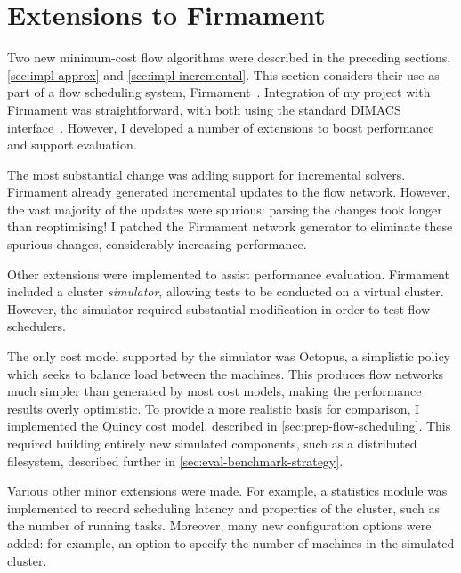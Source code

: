 \section{Extensions to Firmament} \label{sec:impl-firmament}


Two new minimum-cost flow algorithms were described in the preceding sections, \cref{sec:impl-approx} and \cref{sec:impl-incremental}. This section considers their use as part of a flow scheduling system, Firmament~\cite[ch.~5]{Schwarzkopf:2015}. Integration of my project with Firmament was straightforward, with both using the standard DIMACS interface~\cite{DIMACSStandard}. However, I developed a number of extensions to boost performance and support evaluation.

The most substantial change was adding support for incremental solvers. Firmament already generated incremental updates to the flow network. However, the vast majority of the updates were spurious: parsing the changes took longer than reoptimising! I patched the Firmament network generator to eliminate these spurious changes, considerably increasing performance.

Other extensions were implemented to assist performance evaluation. Firmament included a cluster \emph{simulator}, allowing tests to be conducted on a virtual cluster. However, the simulator required substantial modification in order to test flow schedulers.

The only cost model supported by the simulator was Octopus, a simplistic policy which seeks to balance load between the machines. This produces flow networks much simpler than generated by most cost models, making the performance results overly optimistic. To provide a more realistic basis for comparison, I implemented the Quincy cost model, described in \cref{sec:prep-flow-scheduling}. This required building entirely new simulated components, such as a distributed filesystem, described further in \cref{sec:eval-benchmark-strategy}.

Various other minor extensions were made. For example, a statistics module was implemented to record scheduling latency and properties of the cluster, such as the number of running tasks. Moreover, many new configuration options were added: for example, an option to specify the number of machines in the simulated cluster.


